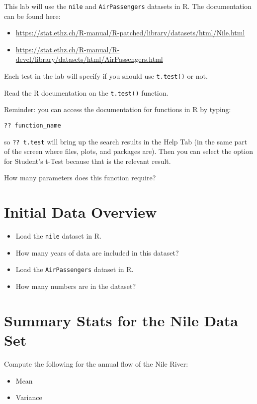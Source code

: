 \documentclass{article}
\begin{document}
This lab will use the \texttt{nile} and \texttt{AirPassengers} datasets in R. The documentation can be found here:

\begin{itemize}
    \item \url{https://stat.ethz.ch/R-manual/R-patched/library/datasets/html/Nile.html}
    \item \url{https://stat.ethz.ch/R-manual/R-devel/library/datasets/html/AirPassengers.html}
\end{itemize}

Each test in the lab will specify if you should use \texttt{t.test()} or not.

Read the R documentation on the \texttt{t.test()} function.

Reminder: you can access the documentation for functions in R by typing:

\begin{center}
    \texttt{?? function\_name}
\end{center}

so \texttt{?? t.test} will bring up the search results in the Help Tab (in the same part of the screen where files, plots, and packages are). Then you can select the option for Student’s t-Test because that is the relevant result.

How many parameters does this function require?

\section*{Initial Data Overview}
\begin{itemize}
    \item Load the \texttt{nile} dataset in R.
    \item How many years of data are included in this dataset?
    \item Load the \texttt{AirPassengers} dataset in R.
    \item How many numbers are in the dataset?
\end{itemize}

\section*{Summary Stats for the Nile Data Set}
Compute the following for the annual flow of the Nile River:
\begin{itemize}
    \item Mean
    \item Variance
\end{itemize}
\end{document}
